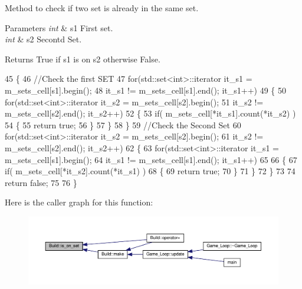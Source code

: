Method to check if two set is already in the same set. 


\begin{DoxyParams}{Parameters}
{\em int} & s1 First set. \\
\hline
{\em int} & s2 Secontd Set. \\
\hline
\end{DoxyParams}
\begin{DoxyReturn}{Returns}
True if s1 is on s2 otherwise False. 
\end{DoxyReturn}

\begin{DoxyCode}
45 \{
46     \textcolor{comment}{//Check the first SET}
47     \textcolor{keywordflow}{for}(std::set<int>::iterator it\_s1 = m\_sets\_cell[s1].begin(); 
48             it\_s1 != m\_sets\_cell[s1].end(); it\_s1++)
49     \{
50         \textcolor{keywordflow}{for}(std::set<int>::iterator it\_s2 = m\_sets\_cell[s2].begin(); 
51                 it\_s2 != m\_sets\_cell[s2].end(); it\_s2++)
52         \{
53             \textcolor{keywordflow}{if}( m\_sets\_cell[*it\_s1].count(*it\_s2) )
54             \{
55                 \textcolor{keywordflow}{return} \textcolor{keyword}{true};
56             \}
57         \}
58     \}
59     \textcolor{comment}{//Check the Second Set}
60     \textcolor{keywordflow}{for}(std::set<int>::iterator it\_s2 = m\_sets\_cell[s2].begin(); 
61             it\_s2 != m\_sets\_cell[s2].end(); it\_s2++)
62     \{
63         \textcolor{keywordflow}{for}(std::set<int>::iterator it\_s1 = m\_sets\_cell[s1].begin(); 
64                 it\_s1 != m\_sets\_cell[s1].end(); it\_s1++)
65 
66         \{
67             \textcolor{keywordflow}{if}( m\_sets\_cell[*it\_s2].count(*it\_s1) )
68             \{
69                 \textcolor{keywordflow}{return} \textcolor{keyword}{true};
70             \}
71         \}
72     \}
73 
74     \textcolor{keywordflow}{return} \textcolor{keyword}{false};
75 
76 \}
\end{DoxyCode}
Here is the caller graph for this function\+:\nopagebreak
\begin{figure}[H]
\begin{center}
\leavevmode
\includegraphics[width=350pt]{classBuild_ae4eeedfd95306c08d50aff3f620b5a47_icgraph}
\end{center}
\end{figure}
\mbox{\label{classBuild_ada5111f265ee6a43832db25e8da9c3d0}} 
